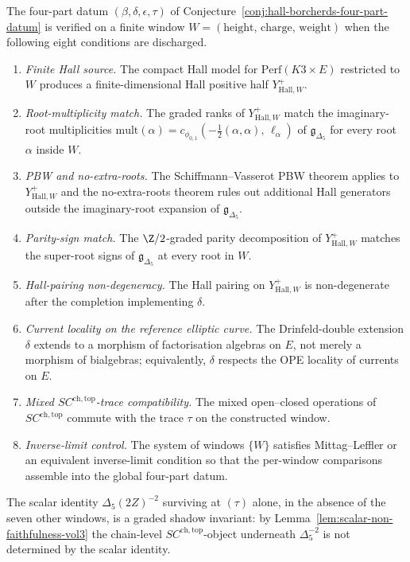 \begin{remark}
\label{rem:hall-borcherds-eight-window-check}
The four-part datum $(\beta, \delta, \epsilon, \tau)$ of Conjecture~\ref{conj:hall-borcherds-four-part-datum} is verified on a finite window $W = (\mathrm{height},\, \mathrm{charge},\, \mathrm{weight})$ when the following eight conditions are discharged.
\begin{enumerate}[label=\textup{(W\arabic*)}]
 \item \emph{Finite Hall source.} The compact Hall model for $\mathrm{Perf}(K3 \times E)$ restricted to $W$ produces a finite-dimensional Hall positive half $Y^+_{\mathrm{Hall}, W}$.
 \item \emph{Root-multiplicity match.} The graded ranks of $Y^+_{\mathrm{Hall}, W}$ match the imaginary-root multiplicities $\mathrm{mult}(\alpha) = c_{\phi_{0, 1}}(-\tfrac{1}{2}(\alpha, \alpha),\, \ell_\alpha)$ of $\mathfrak{g}_{\Delta_5}$ for every root $\alpha$ inside $W$.
 \item \emph{PBW and no-extra-roots.} The Schiffmann--Vasserot PBW theorem applies to $Y^+_{\mathrm{Hall}, W}$ and the no-extra-roots theorem rules out additional Hall generators outside the imaginary-root expansion of $\mathfrak{g}_{\Delta_5}$.
 \item \emph{Parity-sign match.} The $\Z/2$-graded parity decomposition of $Y^+_{\mathrm{Hall}, W}$ matches the super-root signs of $\mathfrak{g}_{\Delta_5}$ at every root in $W$.
 \item \emph{Hall-pairing non-degeneracy.} The Hall pairing on $Y^+_{\mathrm{Hall}, W}$ is non-degenerate after the completion implementing $\delta$.
 \item \emph{Current locality on the reference elliptic curve.} The Drinfeld-double extension $\delta$ extends to a morphism of factorisation algebras on $E$, not merely a morphism of bialgebras; equivalently, $\delta$ respects the OPE locality of currents on $E$.
 \item \emph{Mixed $SC^{\mathrm{ch}, \mathrm{top}}$-trace compatibility.} The mixed open--closed operations of $SC^{\mathrm{ch}, \mathrm{top}}$ commute with the trace $\tau$ on the constructed window.
 \item \emph{Inverse-limit control.} The system of windows $\{W\}$ satisfies Mittag--Leffler or an equivalent inverse-limit condition so that the per-window comparisons assemble into the global four-part datum.
\end{enumerate}
The scalar identity $\Delta_5(2Z)^{-2}$ surviving at $(\tau)$ alone, in the absence of the seven other windows, is a graded shadow invariant: by Lemma~\ref{lem:scalar-non-faithfulness-vol3} the chain-level $SC^{\mathrm{ch}, \mathrm{top}}$-object underneath $\Delta_5^{-2}$ is not determined by the scalar identity.
\end{remark}

